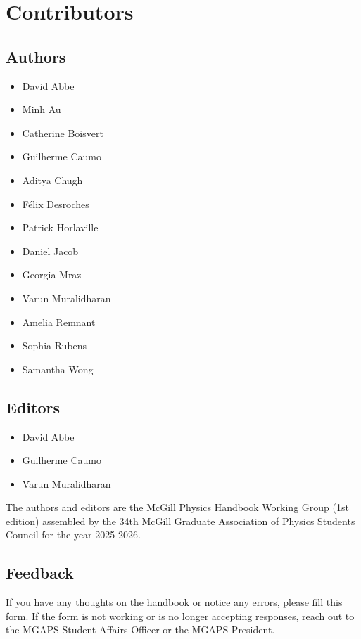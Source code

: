 
\chapter*{Contributors}

\section*{Authors}

\begin{itemize}
    \item David Abbe 
    \item Minh Au 
    \item Catherine Boisvert
    \item Guilherme Caumo
    \item Aditya Chugh
    \item Félix Desroches
    \item Patrick Horlaville
    \item Daniel Jacob
    \item Georgia Mraz
    \item Varun Muralidharan
    \item Amelia Remnant
    \item Sophia Rubens
    \item Samantha Wong
\end{itemize}

\section*{Editors}

\begin{itemize}
    \item David Abbe
    \item Guilherme Caumo
    \item Varun Muralidharan
\end{itemize}

The authors and editors are the McGill Physics Handbook Working Group (1st edition) assembled by the 34th McGill Graduate Association of Physics Students Council for the year 2025-2026. 

\section*{Feedback}
If you have any thoughts on the handbook or notice any errors, please fill \href{https://forms.gle/yzthJZYgL6b3L1AZ8}{this form}. If the form is not working or is no longer accepting responses, reach out to the MGAPS Student Affairs Officer or the MGAPS President.

